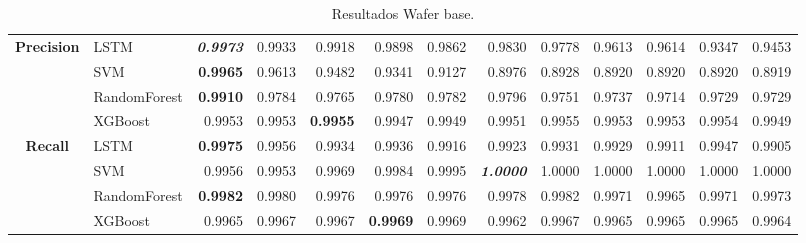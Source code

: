 \begin{table}[H]
\begin{adjustbox}{max width=14cm}
\begin{tabular}{|c|l|r|r|r|r|r|r|r|r|r|r|r|}
			\hline
			\textbf{Precision} &  LSTM & \textit{ \textbf{  0.9973 } } &  0.9933 &  0.9918 &  0.9898 &  0.9862 &  0.9830 &  0.9778 &  0.9613 &  0.9614 &  0.9347 &  0.9453 \\
			&  SVM & \textbf{  0.9965 } &  0.9613 &  0.9482 &  0.9341 &  0.9127 &  0.8976 &  0.8928 &  0.8920 &  0.8920 &  0.8920 &  0.8919 \\
			&  RandomForest & \textbf{  0.9910 } &  0.9784 &  0.9765 &  0.9780 &  0.9782 &  0.9796 &  0.9751 &  0.9737 &  0.9714 &  0.9729 &  0.9729 \\
			&  XGBoost &  0.9953 &  0.9953 & \textbf{  0.9955 } &  0.9947 &  0.9949 &  0.9951 &  0.9955 &  0.9953 &  0.9953 &  0.9954 &  0.9949 \\
			\hline
			\textbf{Recall} &  LSTM & \textbf{  0.9975 } &  0.9956 &  0.9934 &  0.9936 &  0.9916 &  0.9923 &  0.9931 &  0.9929 &  0.9911 &  0.9947 &  0.9905 \\
			&  SVM &  0.9956 &  0.9953 &  0.9969 &  0.9984 &  0.9995 & \textit{ \textbf{  1.0000 } } &  1.0000 &  1.0000 &  1.0000 &  1.0000 &  1.0000 \\
			&  RandomForest & \textbf{  0.9982 } &  0.9980 &  0.9976 &  0.9976 &  0.9976 &  0.9978 &  0.9982 &  0.9971 &  0.9965 &  0.9971 &  0.9973 \\
			&  XGBoost &  0.9965 &  0.9967 &  0.9967 & \textbf{  0.9969 } &  0.9969 &  0.9962 &  0.9967 &  0.9965 &  0.9965 &  0.9965 &  0.9964 \\
			\hline
		\end{tabular}
	\end{adjustbox}
	\caption{Resultados Wafer base.}
	\label{tab:Wafer_base}
\end{table}


